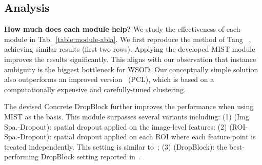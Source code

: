 \documentclass[10pt,twocolumn,letterpaper]{article}
\begin{document}
\vspace{-1em}
\subsection{Analysis}
\label{exp:ablation}
\noindent\textbf{How much does each module help?} 
We study the effectiveness of each module in Tab.~\ref{table:module-abla}. We first reproduce the method of Tang \etal~\cite{tang2017multiple}, achieving similar results (first two rows). Applying the developed MIST module improves the results significantly. This aligns with our observation that instance ambiguity is the biggest bottleneck for WSOD. Our conceptually simple solution also outperforms an improved version~\cite{tang2018pcl} (PCL), which is based on a computationally expensive and carefully-tuned clustering. 

The devised Concrete DropBlock further improves the performance when using MIST as the basis. This module  surpasses several variants  including:  (1) (Img Spa.-Dropout): spatial dropout applied on the image-level features; (2) (ROI-Spa.-Dropout): spatial dropout applied on each ROI where each feature point is treated independently. This setting is similar to~\cite{singh-iccv2017, a-fast-rcnn}; (3) (DropBlock): the best-performing DropBlock setting reported in~\cite{dropblock}.
\end{document}

